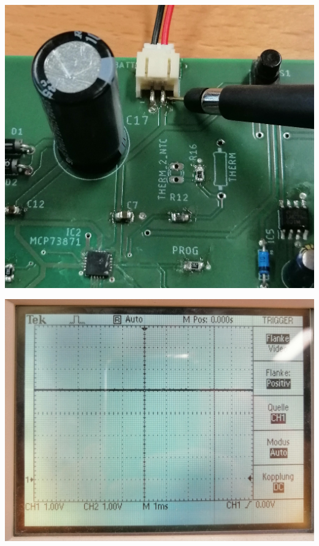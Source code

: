 {\begin{minipage}[b][8cm][t]{0.49\textwidth}
\centering
\includegraphics[width=0.9\linewidth]{graphics/HW_Val/Test_Eingangsspannung.jpg}
\label{fig:Test_Eingangsspannung}
\end{minipage}}
{\begin{minipage}[b][8cm][t]{0.49\textwidth}
\centering
\includegraphics[width=0.9\linewidth]{graphics/HW_Val/Ergebnis_Eingangsspannung.jpg}
\label{fig:Ergebnis_Eingangsspannung}
\end{minipage}}

